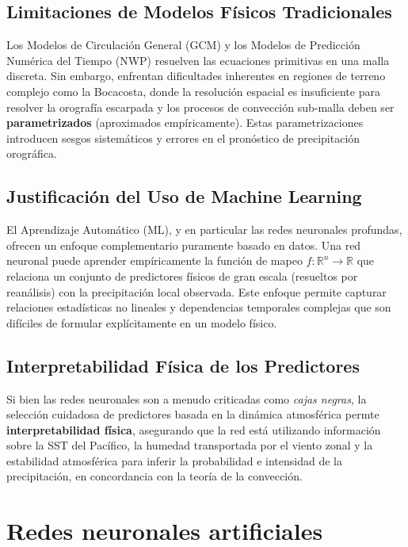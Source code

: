\subsection{Limitaciones de Modelos Físicos Tradicionales}
Los Modelos de Circulación General (GCM) y los Modelos de Predicción Numérica del Tiempo (NWP) resuelven las ecuaciones primitivas en una malla discreta. Sin embargo, enfrentan dificultades inherentes en regiones de terreno complejo como la Bocacosta, donde la resolución espacial es insuficiente para resolver la orografía escarpada y los procesos de convección sub-malla deben ser \textbf{parametrizados} (aproximados empíricamente). Estas parametrizaciones introducen sesgos sistemáticos y errores en el pronóstico de precipitación orográfica.

\subsection{Justificación del Uso de Machine Learning}
El Aprendizaje Automático (ML), y en particular las redes neuronales profundas, ofrecen un enfoque complementario puramente basado en datos. Una red neuronal puede aprender empíricamente la función de mapeo \(f: \mathbb{R}^n \to \mathbb{R}\) que relaciona un conjunto de predictores físicos de gran escala (resueltos por reanálisis) con la precipitación local observada. Este enfoque permite capturar relaciones estadísticas no lineales y dependencias temporales complejas que son difíciles de formular explícitamente en un modelo físico.

\subsection{Interpretabilidad Física de los Predictores}
Si bien las redes neuronales son a menudo criticadas como \textit{cajas negras}, la selección cuidadosa de predictores basada en la dinámica atmosférica permte \textbf{interpretabilidad física}, asegurando que la red está utilizando información sobre la SST del Pacífico, la humedad transportada por el viento zonal y la estabilidad atmosférica para inferir la probabilidad e intensidad de la precipitación, en concordancia con la teoría de la convección.

\section{Redes neuronales artificiales}


